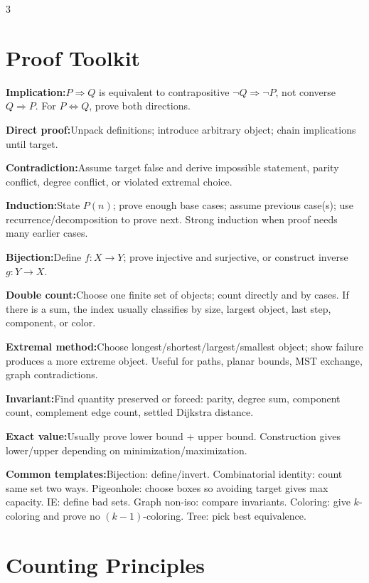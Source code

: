 \documentclass[10pt]{article}
\newenvironment{cheatitems}{\par\vspace{-1pt}}{\par\vspace{-1pt}}
\newcommand{\cheatrow}[2]{\par\noindent\textbf{#1:}\enspace #2\par}
\begin{document}
\begin{multicols}{3}
\scriptsize
\raggedcolumns

\section*{Proof Toolkit}
\begin{cheatitems}
\cheatrow{Implication}{$P\Rightarrow Q$ is equivalent to contrapositive $\neg Q\Rightarrow\neg P$, not converse $Q\Rightarrow P$. For $P\Leftrightarrow Q$, prove both directions.}
\cheatrow{Direct proof}{Unpack definitions; introduce arbitrary object; chain implications until target.}
\cheatrow{Contradiction}{Assume target false and derive impossible statement, parity conflict, degree conflict, or violated extremal choice.}
\cheatrow{Induction}{State $P(n)$; prove enough base cases; assume previous case(s); use recurrence/decomposition to prove next. Strong induction when proof needs many earlier cases.}
\cheatrow{Bijection}{Define $f:X\to Y$; prove injective and surjective, or construct inverse $g:Y\to X$.}
\cheatrow{Double count}{Choose one finite set of objects; count directly and by cases. If there is a sum, the index usually classifies by size, largest object, last step, component, or color.}
\cheatrow{Extremal method}{Choose longest/shortest/largest/smallest object; show failure produces a more extreme object. Useful for paths, planar bounds, MST exchange, graph contradictions.}
\cheatrow{Invariant}{Find quantity preserved or forced: parity, degree sum, component count, complement edge count, settled Dijkstra distance.}
\cheatrow{Exact value}{Usually prove lower bound + upper bound. Construction gives lower/upper depending on minimization/maximization.}
\cheatrow{Common templates}{Bijection: define/invert. Combinatorial identity: count same set two ways. Pigeonhole: choose boxes so avoiding target gives max capacity. IE: define bad sets. Graph non-iso: compare invariants. Coloring: give $k$-coloring and prove no $(k-1)$-coloring. Tree: pick best equivalence.}
\end{cheatitems}

\section*{Counting Principles}

\end{multicols}
\end{document}
